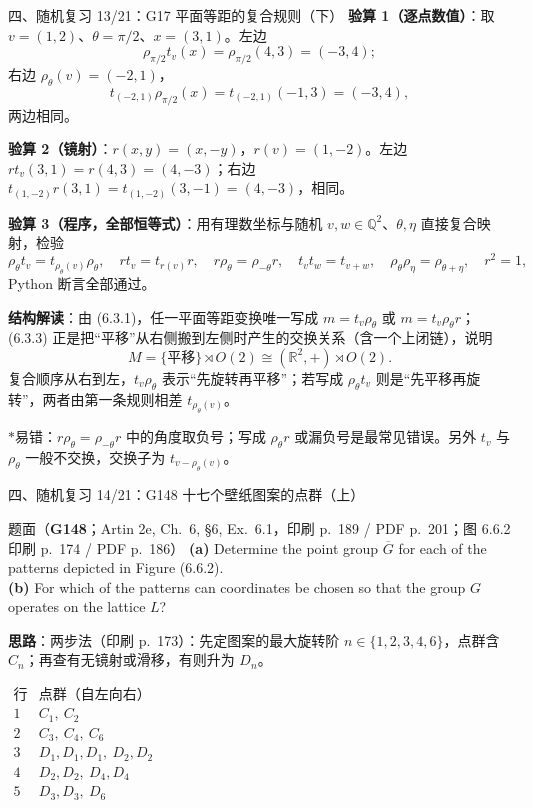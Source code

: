 \documentclass[aspectratio=169,10pt,fontset=none]{ctexbeamer}
\newcommand{\ex}[1]{\textcolor{accent}{\footnotesize\bfseries #1}}
\newcommand{\key}[1]{\textcolor{ink}{\bfseries #1}}
\newcommand{\starpt}{\textcolor{accent}{\bfseries$\ast$}}
\begin{document}
\begin{frame}[t]{四、随机复习 13/21：G17 平面等距的复合规则（下）}
\scriptsize
\key{验算 1（逐点数值）}：取 $v=(1,2)$、$\theta=\pi/2$、$x=(3,1)$。左边
\[ \rho_{\pi/2}t_v(x)=\rho_{\pi/2}(4,3)=(-3,4); \]
右边 $\rho_\theta(v)=(-2,1)$，
\[ t_{(-2,1)}\rho_{\pi/2}(x)=t_{(-2,1)}(-1,3)=(-3,4), \]
两边相同。

\key{验算 2（镜射）}：$r(x,y)=(x,-y)$，$r(v)=(1,-2)$。左边 $rt_v(3,1)=r(4,3)=(4,-3)$；右边 $t_{(1,-2)}r(3,1)=t_{(1,-2)}(3,-1)=(4,-3)$，相同。

\key{验算 3（程序，全部恒等式）}：用有理数坐标与随机 $v,w\in\mathbb Q^2$、$\theta,\eta$ 直接复合映射，检验
\[ \rho_\theta t_v=t_{\rho_\theta(v)}\rho_\theta,\quad rt_v=t_{r(v)}r,\quad r\rho_\theta=\rho_{-\theta}r,\quad t_vt_w=t_{v+w},\quad \rho_\theta\rho_\eta=\rho_{\theta+\eta},\quad r^2=1, \]
Python 断言全部通过。

\key{结构解读}：由 (6.3.1)，任一平面等距变换唯一写成 $m=t_v\rho_\theta$ 或 $m=t_v\rho_\theta r$；(6.3.3) 正是把“平移”从右侧搬到左侧时产生的交换关系（含一个上闭链），说明
\[ M=\{\text{平移}\}\rtimes O(2)\cong (\mathbb R^2,+)\rtimes O(2) . \]
复合顺序从右到左，$t_v\rho_\theta$ 表示“先旋转再平移”；若写成 $\rho_\theta t_v$ 则是“先平移再旋转”，两者由第一条规则相差 $t_{\rho_\theta(v)}$。

\starpt 易错：$r\rho_\theta=\rho_{-\theta}r$ 中的角度取负号；写成 $\rho_\theta r$ 或漏负号是最常见错误。另外 $t_v$ 与 $\rho_\theta$ 一般不交换，交换子为 $t_{v-\rho_\theta(v)}$。
\end{frame}

\begin{frame}[t]{四、随机复习 14/21：G148 十七个壁纸图案的点群（上）}
\label{ex:G148}
\scriptsize
\begin{block}{\footnotesize 题面（\ex{G148}；Artin 2e, Ch.~6, §6, Ex.~6.1，印刷 p.~189 / PDF p.~201；图 6.6.2 印刷 p.~174 / PDF p.~186）}
\textbf{(a)} Determine the point group $\overline G$ for each of the patterns depicted in Figure (6.6.2).\\
\textbf{(b)} For which of the patterns can coordinates be chosen so that the group $G$ operates on the lattice $L$?
\end{block}
\key{思路}：两步法（印刷 p.~173）：先定图案的最大旋转阶 $n\in\{1,2,3,4,6\}$，点群含 $C_n$；再查有无镜射或滑移，有则升为 $D_n$。

\begin{center}
{\scriptsize
$\begin{array}{c|l}
\text{行} & \text{点群（自左向右）}\\ \hline
1 & C_1,\ C_2\\
2 & C_3,\ C_4,\ C_6\\
3 & D_1,D_1,D_1,\ D_2,D_2\\
4 & D_2,D_2,\ D_4,D_4\\
5 & D_3,D_3,\ D_6
\end{array}$}
\end{center}
\end{frame}
\end{document}
